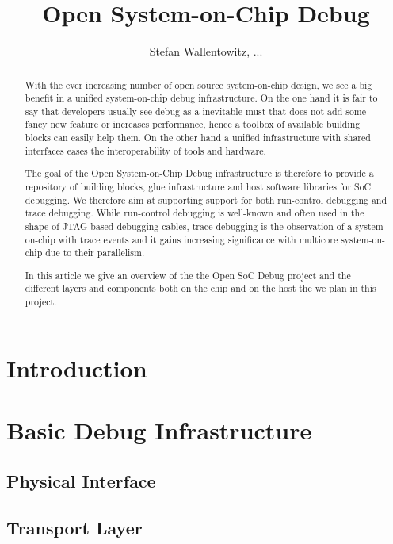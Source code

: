 \documentclass{scrartcl}
\title{Open System-on-Chip Debug}
\author{Stefan Wallentowitz, ...}
\date{}
\begin{document}
\maketitle

\begin{abstract}

  With the ever increasing number of open source system-on-chip
  design, we see a big benefit in a unified system-on-chip debug
  infrastructure. On the one hand it is fair to say that developers
  usually see debug as a inevitable must that does not add some fancy
  new feature or increases performance, hence a toolbox of available
  building blocks can easily help them. On the other hand a unified
  infrastructure with shared interfaces eases the interoperability of
  tools and hardware.

  The goal of the Open System-on-Chip Debug infrastructure is
  therefore to provide a repository of building blocks, glue
  infrastructure and host software libraries for SoC debugging. We
  therefore aim at supporting support for both run-control debugging
  and trace debugging. While run-control debugging is well-known and
  often used in the shape of JTAG-based debugging cables,
  trace-debugging is the observation of a system-on-chip with trace
  events and it gains increasing significance with multicore
  system-on-chip due to their parallelism.

  In this article we give an overview of the the Open SoC Debug
  project and the different layers and components both on the chip and
  on the host the we plan in this project.
\end{abstract}

\section*{Introduction}

\section*{Basic Debug Infrastructure}

\subsection*{Physical Interface}

\subsection*{Transport Layer}
\end{document}
